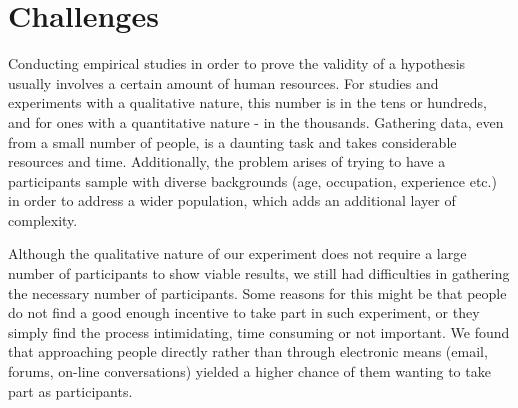 \chapter{Challenges}
\label{section:challenges}

Conducting empirical studies in order to prove the validity of a hypothesis usually involves a certain amount of human resources. For studies and experiments with a qualitative nature, this number is in the tens or hundreds, and for ones with a quantitative nature - in the thousands. Gathering data, even from a small number of people, is a daunting task and takes considerable resources and time. Additionally, the problem arises of trying to have a participants sample with diverse backgrounds (age, occupation, experience etc.) in order to address a wider population, which adds an additional layer of complexity. 

Although the qualitative nature of our experiment does not require a large number of participants to show viable results, we still had difficulties in gathering the necessary number of participants. Some  reasons for this might be that people do not find a good enough incentive to take part in such experiment, or they simply find the process intimidating, time consuming or not important. We found that approaching people directly rather than through electronic means (email, forums, on-line conversations) yielded a higher chance of them wanting to take part as participants. 
